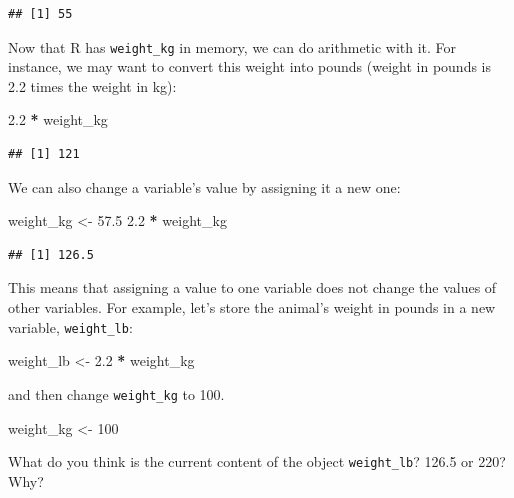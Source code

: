 \documentclass[]{book}
\newenvironment{Shaded}{\begin{snugshade}}{\end{snugshade}}
\newcommand{\DecValTok}[1]{\textcolor[rgb]{0.00,0.00,0.81}{#1}}
\newcommand{\FloatTok}[1]{\textcolor[rgb]{0.00,0.00,0.81}{#1}}
\newcommand{\StringTok}[1]{\textcolor[rgb]{0.31,0.60,0.02}{#1}}
\newcommand{\OperatorTok}[1]{\textcolor[rgb]{0.81,0.36,0.00}{\textbf{#1}}}
\newcommand{\NormalTok}[1]{#1}
\theoremstyle{definition}
\theoremstyle{definition}
\theoremstyle{definition}
\theoremstyle{remark}
\begin{document}
\begin{verbatim}
## [1] 55
\end{verbatim}

Now that R has \texttt{weight\_kg} in memory, we can do arithmetic with
it. For instance, we may want to convert this weight into pounds (weight
in pounds is 2.2 times the weight in kg):

\begin{Shaded}
\begin{Highlighting}[]
\FloatTok{2.2} \OperatorTok{*}\StringTok{ }\NormalTok{weight_kg}
\end{Highlighting}
\end{Shaded}

\begin{verbatim}
## [1] 121
\end{verbatim}

We can also change a variable's value by assigning it a new one:

\begin{Shaded}
\begin{Highlighting}[]
\NormalTok{weight_kg <-}\StringTok{ }\FloatTok{57.5}
\FloatTok{2.2} \OperatorTok{*}\StringTok{ }\NormalTok{weight_kg}
\end{Highlighting}
\end{Shaded}

\begin{verbatim}
## [1] 126.5
\end{verbatim}

This means that assigning a value to one variable does not change the
values of other variables. For example, let's store the animal's weight
in pounds in a new variable, \texttt{weight\_lb}:

\begin{Shaded}
\begin{Highlighting}[]
\NormalTok{weight_lb <-}\StringTok{ }\FloatTok{2.2} \OperatorTok{*}\StringTok{ }\NormalTok{weight_kg}
\end{Highlighting}
\end{Shaded}

and then change \texttt{weight\_kg} to 100.

\begin{Shaded}
\begin{Highlighting}[]
\NormalTok{weight_kg <-}\StringTok{ }\DecValTok{100}
\end{Highlighting}
\end{Shaded}

What do you think is the current content of the object
\texttt{weight\_lb}? 126.5 or 220? Why?
\end{document}
